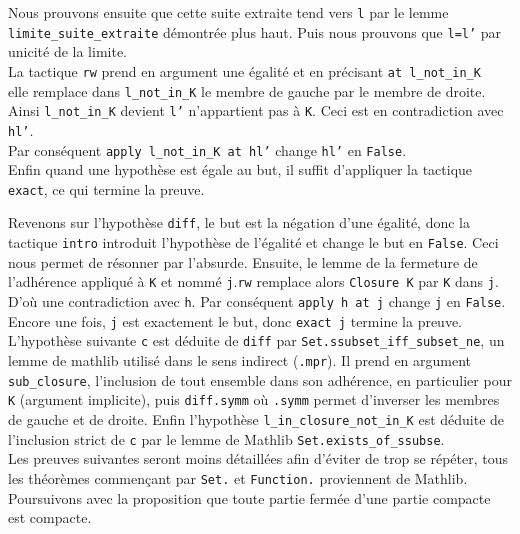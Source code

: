 \documentclass[a4paper, 12pt]{article}
\newcommand{\lean}[1]{\texttt{#1}}
\begin{document}
\begin{itemize}[itemsep=30pt]
        Nous prouvons ensuite que cette suite extraite tend vers \lean{l} par le lemme \lean{limite_suite_extraite} démontrée plus haut. Puis nous prouvons que \lean{l=l'} par unicité de la limite.\\
        La tactique \lean{rw} prend en argument une égalité et en précisant \lean{at l_not_in_K } elle remplace dans \lean{l_not_in_K} le membre de gauche par le membre de droite. Ainsi \lean{l_not_in_K} devient \lean{l'} n'appartient pas à \lean{K}. Ceci est en contradiction avec \lean{hl'}.\\
        Par conséquent \lean{apply l_not_in_K at hl'} change \lean{hl'} en \lean{False}.\\
        Enfin quand une hypothèse est égale au but, il suffit d'appliquer la tactique \lean{exact}, ce qui termine la preuve.
\end{itemize}

\vspace{\baselineskip}
Revenons sur l'hypothèse \lean{diff}, le but est la négation d'une égalité, donc la tactique \lean{intro} introduit l'hypothèse de l'égalité et change le but en \lean{False}. Ceci nous permet de résonner par l'absurde. Ensuite, le lemme de la fermeture de l'adhérence appliqué à \lean{K} et nommé \lean{j}.\lean{rw} remplace alors \lean{Closure K} par \lean{K} dans \lean{j}. D'où une contradiction avec \lean{h}. Par conséquent \lean{apply h at j} change \lean{j} en \lean{False}. Encore une fois, \lean{j} est exactement le but, donc \lean{exact j} termine la preuve. L'hypothèse suivante \lean{c} est déduite de \lean{diff} par \lean{Set.ssubset_iff_subset_ne}, un lemme de mathlib utilisé dans le sens indirect (\lean{.mpr}). Il prend en argument \lean{sub_closure}, l'inclusion de tout ensemble dans son adhérence, en particulier pour \lean{K} (argument implicite), puis \lean{diff.symm} où \lean{.symm} permet d'inverser les membres de gauche et de droite. Enfin l'hypothèse \lean{l_in_closure_not_in_K} est déduite de l'inclusion strict de \lean{c} par le lemme de Mathlib \lean{Set.exists_of_ssubse}.\\

Les preuves suivantes seront moins détaillées afin d'éviter de trop se répéter, tous les théorèmes commençant par \lean{Set.} et \lean{Function.} proviennent de Mathlib. Poursuivons avec la proposition que toute partie fermée d'une partie compacte est compacte.\\
\end{document}
